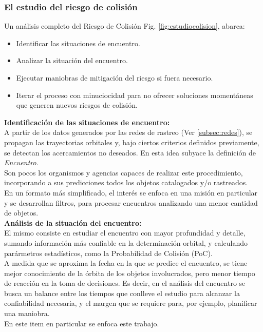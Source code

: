  \subsubsection*{El estudio del riesgo de colisi\'on}

Un an\'alisis completo del Riesgo de Colisi\'on Fig. \ref{fig:estudiocolision}, abarca:

\begin{itemize}
\setlength{\itemsep}{0pt}
\item Identificar las situaciones de encuentro.
\item Analizar la situaci\'on del encuentro.
\item Ejecutar maniobras de mitigaci\'on del riesgo si fuera necesario.
\item Iterar el proceso con minuciocidad para no ofrecer soluciones moment\'aneas que generen nuevos riesgos de colisi\'on.
\end{itemize}

{\bf{Identificaci\'on de las situaciones de encuentro:}}\\
A partir de los datos generados por las redes de rastreo (Ver \ref{subsec:redes}), se propagan las trayectorias orbitales y, bajo ciertos criterios definidos previamente, se detectan los acercamientos no deseados. En esta idea subyace la definici\'on de {\it{Encuentro}}.\\
Son pocos los organismos y agencias capaces de realizar este procedimiento, incorporando a sus predicciones todos los objetos catalogados y/o rastreados.\\
En un formato m\'as simplificado, el inter\'es se enfoca en una misi\'on en particular y se desarrollan filtros, para procesar encuentros analizando una menor cantidad de objetos.\\


{\bf{An\'alisis de la situaci\'on del encuentro: }}\\
El mismo consiste en estudiar el encuentro con mayor profundidad y detalle, sumando informaci\'on m\'as confiable en la determinaci\'on orbital, y calculando par\'armetros estad\'isticos, como la Probabilidad de Colisi\'on (PoC).\\
A medida que se aproxima la fecha en la que se predice el encuentro, se tiene mejor conocimiento de la \'orbita de los objetos involucrados, pero menor tiempo de reacci\'on en la toma de decisiones. Es decir, en el an\'alisis del encuentro se busca un balance entre los tiempos que conlleve el estudio para alcanzar la confiabilidad necesaria, y el margen que se requiere para, por ejemplo, planificar una maniobra.\\
En este item en particular se enfoca este trabajo.\\

